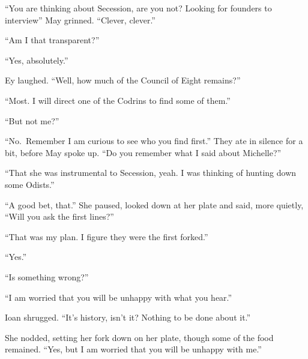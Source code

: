 ``You are thinking about Secession, are you not? Looking for founders to interview'' May grinned. ``Clever, clever.''

``Am I that transparent?''

``Yes, absolutely.''

Ey laughed. ``Well, how much of the Council of Eight remains?''

``Most. I will direct one of the Codrins to find some of them.''

``But not me?''

``No.~Remember I am curious to see who you find first.'' They ate in silence for a bit, before May spoke up. ``Do you remember what I said about Michelle?''

``That she was instrumental to Secession, yeah. I was thinking of hunting down some Odists.''

``A good bet, that.'' She paused, looked down at her plate and said, more quietly, ``Will you ask the first lines?''

``That was my plan. I figure they were the first forked.''

``Yes.''

``Is something wrong?''

``I am worried that you will be unhappy with what you hear.''

Ioan shrugged. ``It's history, isn't it? Nothing to be done about it.''

She nodded, setting her fork down on her plate, though some of the food remained. ``Yes, but I am worried that you will be unhappy with me.''
